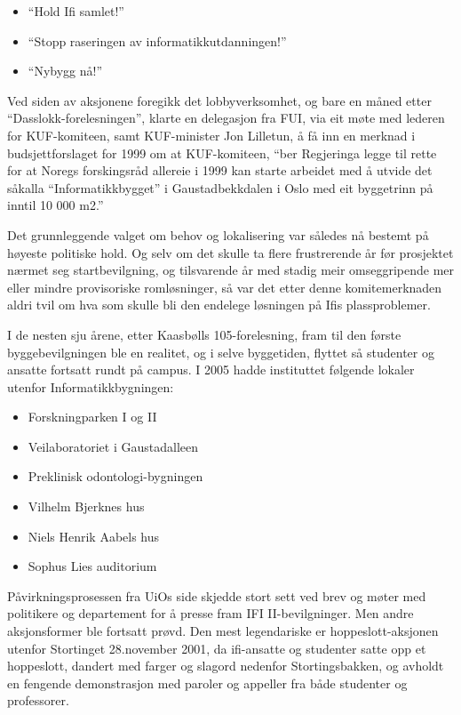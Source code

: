 \documentclass[../../main.tex]{subfiles}
\begin{document}
\begin{itemize}
	\item ``Hold Ifi samlet!''
	\item ``Stopp raseringen av informatikkutdanningen!''
	\item ``Nybygg nå!''
\end{itemize}

Ved siden av aksjonene foregikk det lobbyverksomhet, og bare en måned etter ``Dasslokk-forelesningen'', klarte en delegasjon fra FUI, via eit møte med lederen for KUF-komiteen, samt KUF-minister Jon Lilletun, å få inn en merknad i budsjettforslaget for 1999 om at KUF-komiteen, ``ber Regjeringa legge til rette for at Noregs forskingsråd allereie i 1999 kan starte arbeidet med å utvide det såkalla ``Informatikkbygget'' i Gaustadbekkdalen i Oslo med eit byggetrinn på inntil 10 000 m2.''

Det grunnleggende valget om behov og lokalisering var således nå bestemt på høyeste politiske hold. Og selv om det skulle ta flere frustrerende år før prosjektet nærmet seg startbevilgning, og tilsvarende år med stadig meir omseggripende mer eller mindre provisoriske romløsninger, så var det etter denne komitemerknaden aldri tvil om hva som skulle bli den endelege løsningen på Ifis plassproblemer.

I de nesten sju årene, etter Kaasbølls 105-forelesning, fram til den første byggebevilgningen ble en realitet, og i selve byggetiden, flyttet så studenter og ansatte fortsatt rundt på campus. I 2005 hadde instituttet følgende lokaler utenfor Informatikkbygningen:

\begin{itemize}
	\item Forskningparken I og II
	\item Veilaboratoriet i Gaustadalleen
	\item Preklinisk odontologi-bygningen
	\item Vilhelm Bjerknes hus
	\item Niels Henrik Aabels hus
	\item Sophus Lies auditorium
\end{itemize}

Påvirkningsprosessen fra UiOs side skjedde stort sett ved brev og møter med politikere og departement for å presse fram IFI II-bevilgninger. Men andre aksjonsformer ble fortsatt prøvd. Den mest legendariske er hoppeslott-aksjonen utenfor Stortinget 28.november 2001, da ifi-ansatte og studenter satte opp et hoppeslott, dandert med farger og slagord nedenfor Stortingsbakken, og avholdt en fengende demonstrasjon med paroler og appeller fra både studenter og professorer.
\end{document}
